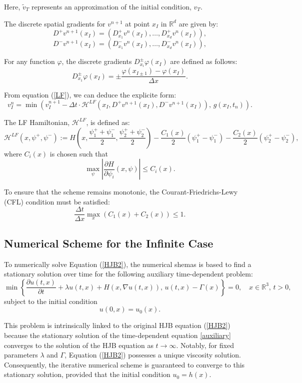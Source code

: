 \documentclass[]{interact}
\theoremstyle{plain}%
\theoremstyle{definition}
\theoremstyle{remark}
\begin{document}
 Here, \(\tilde{v}_T\) represents an approximation of the initial condition, \(v_T\). 

The discrete spatial gradients for \(v^{n+1}\) at point \(x_I\) in \(\mathbb{R}^d\) are given by: \[ D^+v^{n+1}(x_I) = (D_{x_1}^+v^n(x_I), \ldots, D_{x_d}^+v^n(x_I)), \] \[ D^-v^{n+1}(x_I) = (D_{x_1}^-v^n(x_I), \ldots, D_{x_d}^-v^n(x_I)), \] 

For any function \(\varphi\), the discrete gradients \(D^\pm_{x_i}\varphi(x_I)\) are defined as follows: \[ D^\pm_{x_1}\varphi(x_I) = \pm \frac{\varphi(x_{I \pm 1}) - \varphi(x_I)}{\Delta x}. \] 

From equation (\ref{LF}), we can deduce the explicite form: \[ v^{n}_I = \min \left( v^{n+1}_I - \Delta t \cdot \mathcal{H}^{LF}(x_I, D^+ v^{n+1}(x_I), D^- v^{n+1}(x_I)), \, g(x_I,t_n) \right). \] 

The LF Hamiltonian, \(\mathcal{H}^{LF}\), is defined as: \[ \mathcal{H}^{LF}(x, \psi^+, \psi^-) := H(x, \frac{\psi^+_1 + \psi^-_1}{2}, \frac{\psi^+_2 + \psi^-_2}{2}) - \frac{C_1(x)}{2} (\psi^+_1 - \psi^-_1) - \frac{C_2(x)}{2} (\psi^+_2 - \psi^-_2), \] where \( C_i(x) \) is chosen such that \[ \max_{\psi} \left| \frac{\partial H}{\partial \psi_i}(x, \psi) \right| \leq C_i(x). \] 

To ensure that the scheme remains monotonic, the Courant-Friedrichs-Lewy (CFL) condition must be satisfied: \[ \frac{\Delta t }{\Delta x} \max_x (C_1(x) + C_2(x)) \leq 1. \]


\subsection{Numerical Scheme for the Infinite Case}

To numerically solve Equation (\ref{HJB2}), the numerical shemas is based to find a stationary solution over time for the following auxiliary time-dependent problem:
\begin{equation}\label{auxiliary}
\min \left\{ 
\frac{\partial u(t, x)}{\partial t} + \lambda u(t, x) + H\left(x, \nabla u(t, x)\right), \, u(t, x) - \Gamma(x) 
\right\} = 0, \quad x \in \mathbb{R}^3, \, t > 0,
\end{equation}
subject to the initial condition 
\[
u(0, x) = u_0(x).
\]

This problem is intrinsically linked to the original HJB equation (\ref{HJB2}) because the stationary solution of the time-dependent equation \eqref{auxiliary} converges to the solution of the HJB equation as \( t \to \infty \). Notably, for fixed parameters \(\lambda\) and \(\Gamma\), Equation (\ref{HJB2}) possesses a unique viscosity solution. Consequently, the iterative numerical scheme is guaranteed to converge to this stationary solution, provided that the initial condition \(u_0 =h(x)\).
\end{document}
